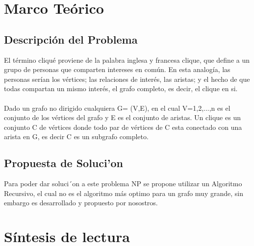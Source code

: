 
\chapter{Marco Teórico}
\section{Descripción del Problema}

El término cliqué proviene de la palabra inglesa y francesa clique, que define a un grupo de personas que comparten intereses en común. En esta analogía, las personas serían los vértices; las relaciones de interés, las aristas; y el hecho de que todas compartan un mismo interés, el grafo completo, es decir, el clique en si.\\\\
Dado un grafo no dirigido cualquiera G= (V,E), en el cual V={1,2,...,n} es el conjunto de  los  vértices  del  grafo  y  E  es  el  conjunto  de  aristas.  Un  clique  es  un  conjunto  C  de  vértices  donde todo par de vértices de C esta conectado con una arista en G, es decir C es un subgrafo completo.

\section{Propuesta de Soluci'on}
Para poder dar soluci´on a este problema NP se propone utilizar un Algoritmo Recursivo, el cual no es el algoritmo más optimo para un grafo muy grande, sin embargo es desarrollado y propuesto por nosostros.

\chapter{Síntesis de lectura}

